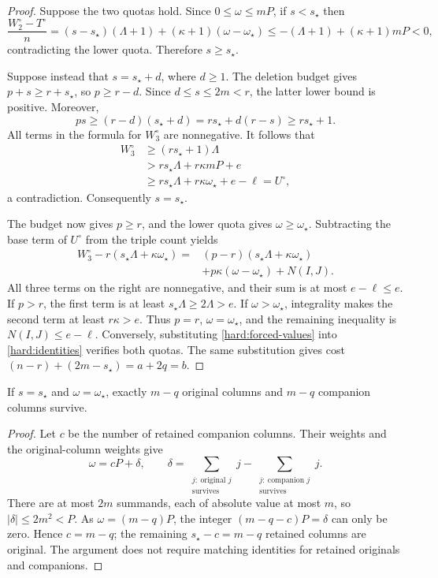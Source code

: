 \begin{proof}
Suppose the two quotas hold. Since \(0\le\omega\le mP\), if
\(s<s_\star\) then
\[
 \frac{W_2^\circ-T^\circ}{n}
 =(s-s_\star)(\Lambda+1)
     +(\kappa+1)(\omega-\omega_\star)
 \le-(\Lambda+1)+(\kappa+1)mP<0,
\]
contradicting the lower quota. Therefore \(s\ge s_\star\).

Suppose instead that \(s=s_\star+d\), where \(d\ge1\).
The deletion budget gives \(p+s\ge r+s_\star\), so \(p\ge r-d\).
Since \(d\le s\le2m<r\), the latter lower bound is positive. Moreover,
\[
 ps\ge(r-d)(s_\star+d)
    =rs_\star+d(r-s)\ge rs_\star+1.
\]
All terms in the formula for \(W_3^\circ\) are nonnegative. It follows that
\[
\begin{aligned}
 W_3^\circ
 &\ge (rs_\star+1)\Lambda\\
 &>rs_\star\Lambda+r\kappa mP+e\\
 &\ge rs_\star\Lambda+r\kappa\omega_\star+e-\ell
   =U^\circ,
\end{aligned}
\]
a contradiction. Consequently \(s=s_\star\).

The budget now gives \(p\ge r\), and the lower quota gives
\(\omega\ge\omega_\star\). Subtracting the base term of \(U^\circ\)
from the triple count yields
\[
\begin{aligned}
 W_3^\circ-r(s_\star\Lambda+\kappa\omega_\star)
  ={}&(p-r)(s_\star\Lambda+\kappa\omega_\star)\\
    &+p\kappa(\omega-\omega_\star)+N(I,J).
\end{aligned}
\]
All three terms on the right are nonnegative, and their sum is at most
\(e-\ell\le e\). If \(p>r\), the first term is at least
\(s_\star\Lambda\ge2\Lambda>e\). If \(\omega>\omega_\star\), integrality
makes the second term at least \(r\kappa>e\).
Thus \(p=r\), \(\omega=\omega_\star\), and the remaining inequality is
\(N(I,J)\le e-\ell\). Conversely, substituting
\eqref{hard:forced-values} into \eqref{hard:identities} verifies both quotas.
The same substitution gives cost \((n-r)+(2m-s_\star)=a+2q=b\).
\end{proof}

\begin{lemma}
\label{hard:balance}
If \(s=s_\star\) and \(\omega=\omega_\star\), exactly \(m-q\) original
columns and \(m-q\) companion columns survive.
\end{lemma}

\begin{proof}
Let \(c\) be the number of retained companion columns. Their weights and
the original-column weights give
\[
 \omega=cP+\delta,\qquad
 \delta=\sum_{\substack{j:\ \text{original }j\\\text{survives}}}j
       -\sum_{\substack{j:\ \text{companion }j\\\text{survives}}}j.
\]
There are at most \(2m\) summands, each of absolute value at most \(m\),
so \(|\delta|\le2m^2<P\). As \(\omega=(m-q)P\), the integer
\((m-q-c)P=\delta\) can only be zero. Hence \(c=m-q\);
the remaining \(s_\star-c=m-q\) retained columns are original.
The argument does not require matching identities for retained originals
and companions.
\end{proof}

